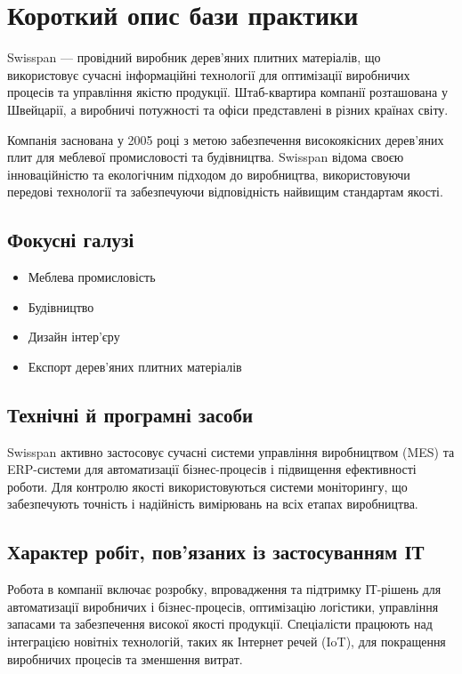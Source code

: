 \documentclass[oneside,14pt]{extarticle}
\begin{document}
\setcounter{page}{2}
\tableofcontents
\newpage

\section{Короткий опис бази практики}
Swisspan — провідний виробник дерев'яних плитних матеріалів, що використовує сучасні інформаційні технології для оптимізації виробничих процесів та управління якістю продукції. Штаб-квартира компанії розташована у Швейцарії, а виробничі потужності та офіси представлені в різних країнах світу.

Компанія заснована у 2005 році з метою забезпечення високоякісних дерев'яних плит для меблевої промисловості та будівництва. Swisspan відома своєю інноваційністю та екологічним підходом до виробництва, використовуючи передові технології та забезпечуючи відповідність найвищим стандартам якості.

\subsection{Фокусні галузі}
\begin{itemize}
	\item Меблева промисловість
	\item Будівництво
	\item Дизайн інтер'єру
	\item Експорт дерев'яних плитних матеріалів
\end{itemize}

\subsection{Технічні й програмні засоби}

Swisspan активно застосовує сучасні системи управління виробництвом (MES) та ERP-системи для автоматизації бізнес-процесів і підвищення ефективності роботи. Для контролю якості використовуються системи моніторингу, що забезпечують точність і надійність вимірювань на всіх етапах виробництва.

\subsection{Характер робіт, пов’язаних із застосуванням ІТ}

Робота в компанії включає розробку, впровадження та підтримку ІТ-рішень для автоматизації виробничих і бізнес-процесів, оптимізацію логістики, управління запасами та забезпечення високої якості продукції. Спеціалісти працюють над інтеграцією новітніх технологій, таких як Інтернет речей (IoT), для покращення виробничих процесів та зменшення витрат.
\end{document}
